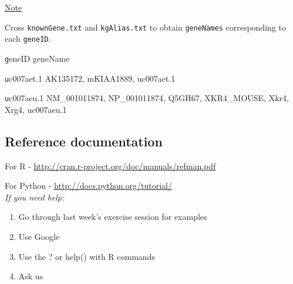 \documentclass[a4paper,11pt]{article}
\begin{document}
\normalsize\underline{Note}

\indent\normalsize Cross \texttt{knownGene.txt} and \texttt{kgAlias.txt} to obtain \texttt{geneNames} corresponding to each \texttt{geneID}.

\scriptsize\texttt  geneID geneName

\scriptsize\texttt  uc007aet.1	AK135172, mKIAA1889, uc007aet.1

\scriptsize\texttt  uc007aeu.1	NM\_001011874, NP\_001011874, Q5GH67, XKR4\_MOUSE, Xkr4, Xrg4, uc007aeu.1

\subsection{Reference documentation}
\normalsize For R - \url{http://cran.r-project.org/doc/manuals/refman.pdf}

For Python - \url{http://docs.python.org/tutorial/}\\

\emph{If you need help:}
\begin{enumerate}
\item Go through last week's exercise session for examples
\item Use Google
\item Use the ? or help() with R commands
\item Ask us
\end{enumerate}
\end{document}
